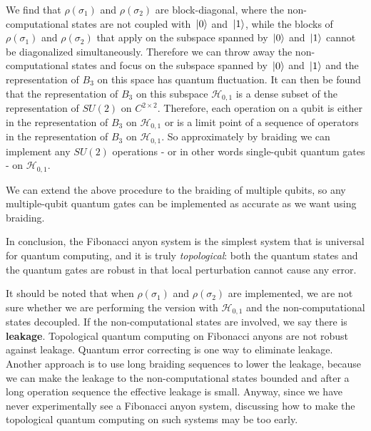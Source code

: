 \documentclass[hyperref, a4paper]{article}
\newcommand*{\concept}[1]{{\textbf{#1}}}
\def\mathbb#1{#1}%
\begin{document}
We find that $\rho(\sigma_1)$ and $\rho(\sigma_2)$ are block-diagonal, where the non-computational 
states are not coupled with $\ket*{0}$ and $\ket*{1}$, while the blocks of $\rho(\sigma_1)$ and $\rho(\sigma_2)$
that apply on the subspace spanned by $\ket*{0}$ and $\ket*{1}$ cannot be diagonalized simultaneously.
Therefore we can throw away the non-computational states and focus on the subspace spanned by $\ket*{0}$ and $\ket*{1}$
and the representation of $B_3$ on this space has quantum fluctuation.
It can then be found that the representation of $B_3$ on this subspace $\mathcal{H}_{0, 1}$ is a dense subset of the representation 
of $SU(2)$ on $\mathbb{C}^{2 \times 2}$.
Therefore, each operation on a qubit is either in the representation of $B_3$ on $\mathcal{H}_{0, 1}$ or is a limit point of a sequence 
of operators in the representation of $B_3$ on $\mathcal{H}_{0, 1}$.
So approximately by braiding we can implement any $SU(2)$ operations - or in other words single-qubit quantum gates - 
on $\mathcal{H}_{0, 1}$.

We can extend the above procedure to the braiding of multiple qubits, so any multiple-qubit quantum gates can be implemented as 
accurate as we want using braiding. 

In conclusion, the Fibonacci anyon system is the simplest system that is universal for quantum computing, and it is truly 
\emph{topological}: both the quantum states and the quantum gates are robust in that local perturbation cannot cause any error.

It should be noted that when $\rho(\sigma_1)$ and $\rho(\sigma_2)$ are implemented, we are not sure whether we are performing the 
version with $\mathcal{H}_{0, 1}$ and the non-computational states decoupled.
If the non-computational states are involved, we say there is \concept{leakage}. Topological quantum computing on Fibonacci anyons
are not robust against leakage. Quantum error correcting is one way to eliminate leakage. Another approach is to use long braiding
sequences to lower the leakage, because we can make the leakage to the non-computational states bounded and after a long operation
sequence the effective leakage is small. Anyway, since we have never experimentally see a Fibonacci anyon system, discussing how to 
make the topological quantum computing on such systems may be too early.
\end{document}
